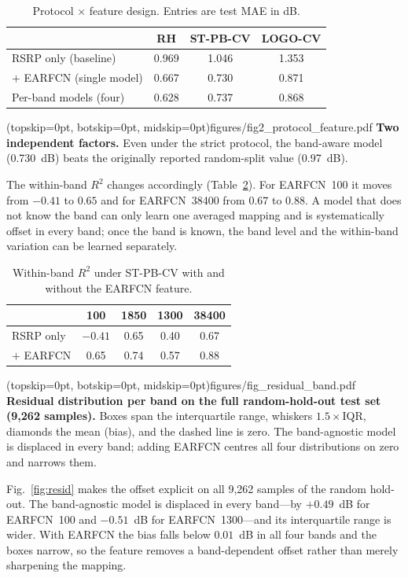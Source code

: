 \documentclass{ieeeaccess}
\begin{document}
\begin{table}
\caption{Protocol $\times$ feature design. Entries are test MAE in dB.}
\label{tab:band}
\setlength{\tabcolsep}{3pt}
\begin{tabular}{|l|c|c|c|}
\hline
 & RH & ST-PB-CV & LOGO-CV\\
\hline
RSRP only (baseline) & 0.969 & 1.046 & 1.353\\
$+$ EARFCN (single model) & 0.667 & 0.730 & 0.871\\
Per-band models (four) & 0.628 & 0.737 & 0.868\\
\hline
\end{tabular}
\end{table}

\Figure[t!](topskip=0pt, botskip=0pt, midskip=0pt){figures/fig2_protocol_feature.pdf}
{\textbf{Two independent factors.} Even under the strict protocol, the band-aware
model (0.730~dB) beats the originally reported random-split value (0.97~dB).\label{fig:ours}}

The within-band $R^2$ changes accordingly (Table~\ref{tab:within}). For EARFCN~100
it moves from $-0.41$ to $0.65$ and for EARFCN~38400 from $0.67$ to $0.88$. A
model that does not know the band can only learn one averaged mapping and is
systematically offset in every band; once the band is known, the band level and
the within-band variation can be learned separately.

\begin{table}
\caption{Within-band $R^2$ under ST-PB-CV with and without the EARFCN feature.}
\label{tab:within}
\setlength{\tabcolsep}{3pt}
\begin{tabular}{|l|c|c|c|c|}
\hline
 & 100 & 1850 & 1300 & 38400\\
\hline
RSRP only & $-0.41$ & 0.65 & 0.40 & 0.67\\
$+$ EARFCN & 0.65 & 0.74 & 0.57 & 0.88\\
\hline
\end{tabular}
\end{table}

\Figure[t!](topskip=0pt, botskip=0pt, midskip=0pt){figures/fig_residual_band.pdf}
{\textbf{Residual distribution per band on the full random-hold-out test set
(9{,}262 samples).}
Boxes span the interquartile range, whiskers $1.5\times$IQR, diamonds the mean
(bias), and the dashed line is zero. The band-agnostic model is displaced in
every band; adding EARFCN centres all four distributions on zero and narrows
them.\label{fig:resid}}

Fig.~\ref{fig:resid} makes the offset explicit on all 9{,}262 samples of the
random hold-out. The
band-agnostic model is displaced in every band---by $+0.49$~dB for EARFCN~100 and
$-0.51$~dB for EARFCN~1300---and its interquartile range is wider. With EARFCN the
bias falls below $0.01$~dB in all four bands and the boxes narrow, so the feature
removes a band-dependent offset rather than merely sharpening the mapping.
\end{document}
